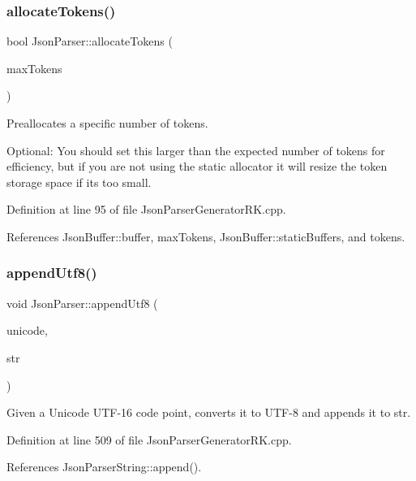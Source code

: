 \subsubsection{\texorpdfstring{allocate\+Tokens()}{allocateTokens()}}
{\footnotesize\ttfamily bool Json\+Parser\+::allocate\+Tokens (\begin{DoxyParamCaption}\item[{size\+\_\+t}]{max\+Tokens }\end{DoxyParamCaption})}



Preallocates a specific number of tokens. 

Optional\+: You should set this larger than the expected number of tokens for efficiency, but if you are not using the static allocator it will resize the token storage space if it\textquotesingle{}s too small. 

Definition at line 95 of file Json\+Parser\+Generator\+R\+K.\+cpp.



References Json\+Buffer\+::buffer, max\+Tokens, Json\+Buffer\+::static\+Buffers, and tokens.

\mbox{\label{class_json_parser_a498dcdec7949c88dfc454d052e25ff69}} 
\subsubsection{\texorpdfstring{append\+Utf8()}{appendUtf8()}}
{\footnotesize\ttfamily void Json\+Parser\+::append\+Utf8 (\begin{DoxyParamCaption}\item[{uint16\+\_\+t}]{unicode,  }\item[{\hyperlink{class_json_parser_string}{Json\+Parser\+String} \&}]{str }\end{DoxyParamCaption})\hspace{0.3cm}{\ttfamily [static]}}



Given a Unicode U\+T\+F-\/16 code point, converts it to U\+T\+F-\/8 and appends it to str. 



Definition at line 509 of file Json\+Parser\+Generator\+R\+K.\+cpp.



References Json\+Parser\+String\+::append().



